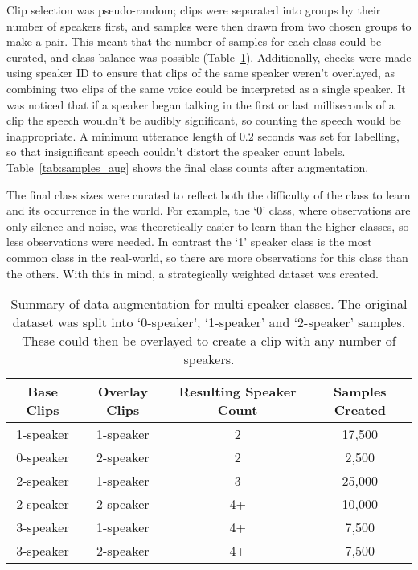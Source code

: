 \noindent Clip selection was pseudo-random; clips were separated into groups by their number of speakers first, and samples were then drawn from two chosen groups to make a pair. This meant that the number of samples for each class could be curated, and class balance was possible (Table~\ref{tab:augmentation_summary}). Additionally, checks were made using speaker ID to ensure that clips of the same speaker weren't overlayed, as combining two clips of the same voice could be interpreted as a single speaker. It was noticed that if a speaker began talking in the first or last milliseconds of a clip the speech wouldn't be audibly significant, so counting the speech would be inappropriate. A minimum utterance length of $0.2$ seconds was set for labelling, so that insignificant speech couldn't distort the speaker count labels. Table~\ref{tab:samples_aug} shows the final class counts after augmentation. \newline

\noindent The final class sizes were curated to reflect both the difficulty of the class to learn and its occurrence in the world. For example, the `0' class, where observations are only silence and noise, was theoretically easier to learn than the higher classes, so less observations were needed. In contrast the `1' speaker class is the most common class in the real-world, so there are more observations for this class than the others. With this in mind, a strategically weighted dataset was created.

\begin{table}[H]
  \centering
  \caption{Summary of data augmentation for multi-speaker classes. The original dataset was split into `0-speaker', `1-speaker' and `2-speaker' samples. These could then be overlayed to create a clip with any number of speakers.}
  \label{tab:augmentation_summary}
  \begin{tabular}{|c|c|c|c|}
    \hline
    \textbf{Base Clips} & \textbf{Overlay Clips} & \textbf{Resulting Speaker Count} & \textbf{Samples Created} \\
    \hline
    1-speaker & 1-speaker & 2 & 17,500 \\
    \hline
    0-speaker & 2-speaker & 2 & 2,500 \\
    \hline
    2-speaker & 1-speaker & 3 & 25,000 \\
    \hline
    2-speaker & 2-speaker & 4+ & 10,000 \\
    \hline
    3-speaker & 1-speaker & 4+ & 7,500 \\
    \hline
    3-speaker & 2-speaker & 4+ & 7,500 \\
    \hline
  \end{tabular}
\end{table}




